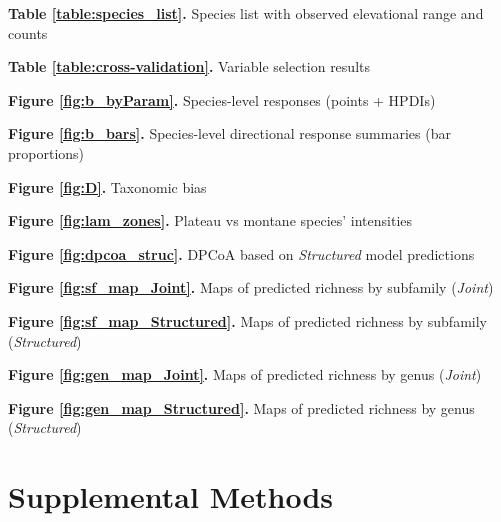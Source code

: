 \documentclass[preprint,review,times,12pt,3p]{elsarticle}
\begin{document}
\textbf{Table \ref{table:species_list}.} Species list with observed elevational range and counts

\textbf{Table \ref{table:cross-validation}.} Variable selection results

\textbf{Figure \ref{fig:b_byParam}.} Species-level responses (points + HPDIs)

\textbf{Figure \ref{fig:b_bars}.} Species-level directional response summaries (bar proportions)

\textbf{Figure \ref{fig:D}.} Taxonomic bias

\textbf{Figure \ref{fig:lam_zones}.} Plateau vs montane species' intensities

\textbf{Figure \ref{fig:dpcoa_struc}.} DPCoA based on \emph{Structured} model predictions

\textbf{Figure \ref{fig:sf_map_Joint}.} Maps of predicted richness by subfamily (\emph{Joint})

\textbf{Figure \ref{fig:sf_map_Structured}.} Maps of predicted richness by subfamily (\emph{Structured})

\textbf{Figure \ref{fig:gen_map_Joint}.} Maps of predicted richness by genus (\emph{Joint})

\textbf{Figure \ref{fig:gen_map_Structured}.} Maps of predicted richness by genus (\emph{Structured})



\newpage
\appendix

\section{Supplemental Methods}
\end{document}
